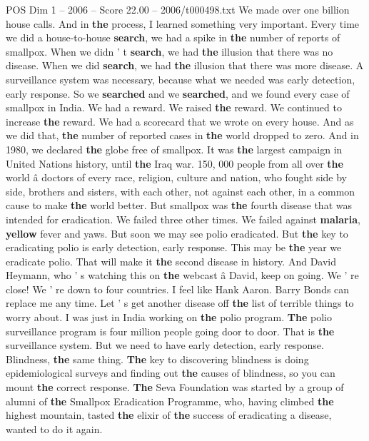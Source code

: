 \begin{textsample}{POS Dim 1 – 2006 – Score 22.00 – 2006/t000498.txt}
We made over one billion house calls.
And in \textbf{the} process, I learned something very important.
Every time we did a house-to-house \textbf{search}, we had a spike in \textbf{the} number of reports of smallpox.
When we didn ' t \textbf{search}, we had \textbf{the} illusion that there was no disease.
When we did \textbf{search}, we had \textbf{the} illusion that there was more disease.
A surveillance system was necessary, because what we needed was early detection, early response.
So we \textbf{searched} and we \textbf{searched}, and we found every case of smallpox in India.
We had a reward.
We raised \textbf{the} reward.
We continued to increase \textbf{the} reward.
We had a scorecard that we wrote on every house.
And as we did that, \textbf{the} number of reported cases in \textbf{the} world dropped to zero.
And in 1980, we declared \textbf{the} globe free of smallpox.
It was \textbf{the} largest campaign in United Nations history, until \textbf{the} Iraq war. 150, 000 people from all over \textbf{the} world â doctors of every race, religion, culture and nation, who fought side by side, brothers and sisters, with each other, not against each other, in a common cause to make \textbf{the} world better.
But smallpox was \textbf{the} fourth disease that was intended for eradication.
We failed three other times.
We failed against \textbf{malaria}, \textbf{yellow} fever and yaws.
But soon we may see polio eradicated.
But \textbf{the} key to eradicating polio is early detection, early response.
This may be \textbf{the} year we eradicate polio.
That will make it \textbf{the} second disease in history.
And David Heymann, who ' s watching this on \textbf{the} webcast â David, keep on going.
We ' re close!
We ' re down to four countries.
I feel like Hank Aaron.
Barry Bonds can replace me any time.
Let ' s get another disease off \textbf{the} list of terrible things to worry about.
I was just in India working on \textbf{the} polio program. \textbf{The} polio surveillance program is four million people going door to door.
That is \textbf{the} surveillance system.
But we need to have early detection, early response.
Blindness, \textbf{the} same thing. \textbf{The} key to discovering blindness is doing epidemiological surveys and finding out \textbf{the} causes of blindness, so you can mount \textbf{the} correct response. \textbf{The} Seva Foundation was started by a group of alumni of \textbf{the} Smallpox Eradication Programme, who, having climbed \textbf{the} highest mountain, tasted \textbf{the} elixir of \textbf{the} success of eradicating a disease, wanted to do it again.

\end{textsample}

